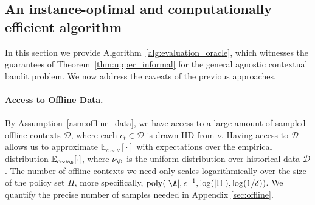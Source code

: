 \documentclass{article}
\newcommand{\mc}[1]{\mathcal{#1}}
\newcommand{\1}{\mathbf{1}}
\begin{document}
\subsection{An instance-optimal and computationally efficient algorithm}\label{sec:alg}
In this section we provide Algorithm~\ref{alg:evaluation_oracle}, which witnesses the guarantees of Theorem~\ref{thm:upper_informal} for the general agnostic contextual bandit problem. We now address the caveats of the previous approaches.

\paragraph{Access to Offline Data.} By Assumption~\ref{asm:offline_data}, we have access to a large amount of sampled offline contexts $\mathcal{D}$, where each $c_t\in \mathcal{D}$ is drawn IID from $\nu$. Having access to $\mc{D}$ allows us to approximate $\mathbb{E}_{c\sim \nu}[\cdot]$ with expectations over the empirical distribution $\mathbb{E}_{c\sim \nu_\D}[\cdot]$, where $\nu_\D$ is the uniform distribution over historical data $\mc{D}$. The number of offline contexts we need only scales logarithmically over the size of the policy set $\Pi$, more specifically, $\operatorname{poly}(|\A|,\epsilon^{-1}, \log(|\Pi|),\log(1/\delta))$. We quantify the precise number of samples needed in Appendix \ref{sec:offline}. 
\end{document}
